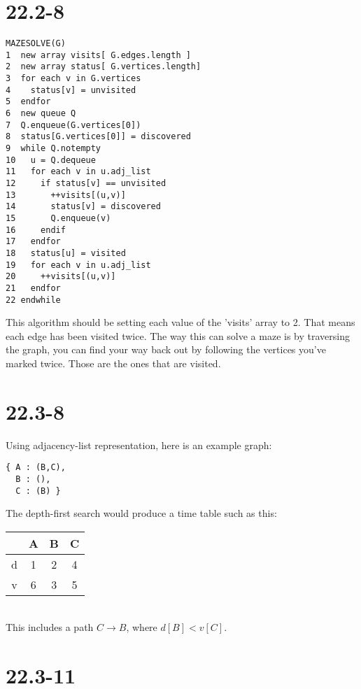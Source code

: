 \documentclass{article}
\begin{document}
\section*{22.2-8}
\begin{verbatim}
MAZESOLVE(G)
1  new array visits[ G.edges.length ]
2  new array status[ G.vertices.length]
3  for each v in G.vertices
4    status[v] = unvisited
5  endfor
6  new queue Q
7  Q.enqueue(G.vertices[0])
8  status[G.vertices[0]] = discovered
9  while Q.notempty
10   u = Q.dequeue
11   for each v in u.adj_list
12     if status[v] == unvisited
13       ++visits[(u,v)]
14       status[v] = discovered
15       Q.enqueue(v)
16     endif
17   endfor
18   status[u] = visited
19   for each v in u.adj_list
20     ++visits[(u,v)]
21   endfor
22 endwhile
\end{verbatim}
This algorithm should be setting each value of the 'visits' array to 2.
That means each edge has been visited twice. The way this can solve a maze
is by traversing the graph, you can find your way back out by following the
vertices you've marked twice. Those are the ones that are visited.\\

\section*{22.3-8}
Using adjacency-list representation, here is an example graph:
\begin{verbatim}
{ A : (B,C),
  B : (),
  C : (B) }
\end{verbatim}
The depth-first search would produce a time table such as this:\\
\begin{tabular}{|c|c c c|}
\hline
  & A & B & C\\
\hline
d & 1 & 2 & 4\\
\hline
v & 6 & 3 & 5\\
\hline
\end{tabular}
\\This includes a path $C \rightarrow B$, where $d[B] < v[C]$.\\

\section*{22.3-11}
\end{document}
